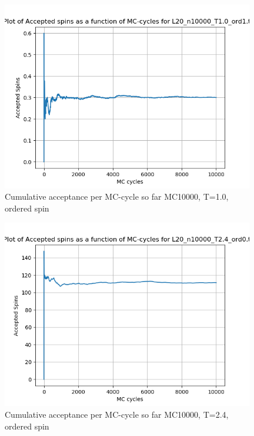 \documentclass{article}
\begin{document}
  \begin{figure}[ht]
      \centering
      \includegraphics[width = 11cm]{img/accept_L20_n10000_T10_ord1.png}
      \caption{Cumulative acceptance per MC-cycle so far MC10000, T=1.0, ordered spin}
      \label{fig:accept_L20_n10000_T1.0_ord1}
    \end{figure}

  \begin{figure}[ht]
      \centering
      \includegraphics[width = 11cm]{img/accept_L20_n10000_T24_ord0.png}
      \caption{Cumulative acceptance per MC-cycle so far MC10000, T=2.4, ordered spin}
      \label{fig:accept_L20_n10000_T2.4_ord0}
    \end{figure}
\end{document}
